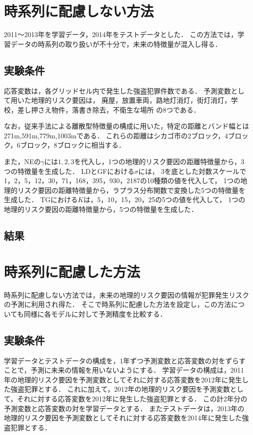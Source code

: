 \documentclass[12pt,a4paper,oneside]{jsbook}
\theoremstyle{plain}
\begin{document}
\section{時系列に配慮しない方法}
\label{non-crime-no-timeseries-method}
2011〜2013年を学習データ，2014年をテストデータとした．
この方法では，学習データの時系列の取り扱いが不十分で，未来の特徴量が混入し得る．

\subsection{実験条件}

応答変数は，各グリッドセル内で発生した強盗犯罪件数である．
予測変数として用いた地理的リスク要因は，
廃屋，放置車両，路地灯消灯，街灯消灯，学校，差し押さえ物件，落書き除去，不衛生な場所
の8つである．

なお，従来手法による離散型特徴量の構成に用いた，特定の距離とバンド幅とは271m,591m,779m,1003mである．
これらの距離はシカゴ市の2ブロック，4ブロック，6ブロック，8ブロックに相当する．

また，NEの$\gamma$には$1,2,3$を代入し，1つの地理的リスク要因の距離特徴量から，3つの特徴量を生成した．
LDとGFにおける$\sigma$には，
$3$を底とした対数スケールで1，2，5，12，30，71，168，395，930，2187の10種類の値を代入して，
1つの地理的リスク要因の距離特徴量から，ラプラス分布関数で変換した5つの特徴量を生成した．
TGにおける$K$は，5，10，15，20，25の5つの値を代入して，
1つの地理的リスク要因の距離特徴量から，5つの特徴量を生成した．

\subsection{結果}
\label{non-crime-no-timeseries-result}
% 
\section{時系列に配慮した方法}
\label{non-crime-timeseries-method}
時系列に配慮しない方法では，未来の地理的リスク要因の情報が犯罪発生リスクの予測に利用され得た．
そこで時系列に配慮した方法を設定し，この方法についても同様に各モデルに対して予測精度を比較する．
\subsection{実験条件}
学習データとテストデータの構成を，1年ずつ予測変数と応答変数の対をずらすことで，予測に未来の情報を用いないようにする．
学習データの構成は，2011年の地理的リスク要因を予測変数としてそれに対する応答変数を2012年に発生した強盗犯罪とする．
これに加えて，2012年の地理的リスク要因を予測変数として，それに対する応答変数を2012年に発生した強盗犯罪とする．
この計2年分の予測変数と応答変数の対を学習データとする．
またテストデータは，2013年の地理的リスク要因を予測変数としてそれに対する応答変数を2014年に発生した強盗犯罪とする．
\end{document}
